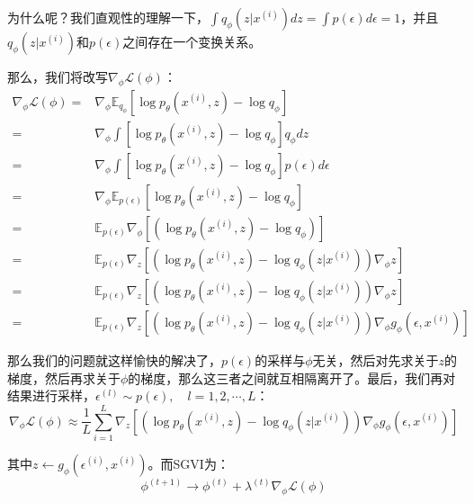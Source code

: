 \documentclass[a4paper]{article}
\begin{document}
为什么呢？我们直观性的理解一下，$\int q_{\phi}(z|x^{(i)})dz = 
\int p(\epsilon)d\epsilon = 1$，并且$q_{\phi}(z|x^{(i)})$和$p(\epsilon)$之间存在一个变换关系。

那么，我们将改写$\nabla_{\phi} \mathcal{L}(\phi)$：
\begin{equation}
    \begin{split}
        \nabla_{\phi} \mathcal{L}(\phi) 
        = & \nabla_{\phi} \mathbb{E}_{q_{\phi}}\left[ \log p_{\theta}(x^{(i)},z) - \log q_{\phi} \right] \\
        = & \nabla_{\phi} \int \left[ \log p_{\theta}(x^{(i)},z) - \log q_{\phi} \right]q_{\phi} dz \\
        = & \nabla_{\phi} \int \left[ \log p_{\theta}(x^{(i)},z) - \log q_{\phi} \right]p(\epsilon) d\epsilon \\
         = & \nabla_{\phi} \mathbb{E}_{p(\epsilon)}\left[ \log p_{\theta}(x^{(i)},z) - \log q_{\phi} \right] \\
         = & \mathbb{E}_{p(\epsilon)} \nabla_{\phi} \left[( \log p_{\theta}(x^{(i)},z) - \log q_{\phi}) \right] \\
         = & \mathbb{E}_{p(\epsilon)}\nabla_{z}\left[( \log p_{\theta}(x^{(i)},z) - \log q_{\phi}(z|x^{(i)}))\nabla_{\phi}z \right] \\
         = & \mathbb{E}_{p(\epsilon)}\nabla_{z}\left[( \log p_{\theta}(x^{(i)},z) - \log q_{\phi}(z|x^{(i)}))\nabla_{\phi}z \right] \\
         = & \mathbb{E}_{p(\epsilon)}\nabla_{z}\left[( \log p_{\theta}(x^{(i)},z) - \log q_{\phi}(z|x^{(i)}))\nabla_{\phi}g_{\phi}(\epsilon, x^{(i)}) \right]
    \end{split}
\end{equation}

那么我们的问题就这样愉快的解决了，$p(\epsilon)$的采样与$\phi$无关，然后对先求关于$z$的梯度，然后再求关于$\phi$的梯度，那么这三者之间就互相隔离开了。最后，我们再对结果进行采样，$\epsilon^{(l)} \sim p(\epsilon), \quad l = 1, 2, \cdots, L$：
\begin{equation}
    \nabla_{\phi} \mathcal{L}(\phi) \approx \frac{1}{L} \sum_{i=1}^L
    \nabla_{z} \left[ (\log p_{\theta}(x^{(i)},z) - \log q_{\phi}(z|x^{(i)}))\nabla_{\phi}g_{\phi}(\epsilon, x^{(i)}) \right]
\end{equation}

其中$z \longleftarrow g_{\phi}(\epsilon^{(i)},x^{(i)})$。而SGVI为：
\begin{equation}
    \phi^{(t+1)} \longrightarrow \phi^{(t)} + \lambda^{(t)}\nabla_{\phi} \mathcal{L}(\phi)
\end{equation}
\end{document}
